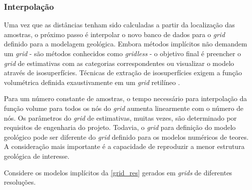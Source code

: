 \begin{figure}[H]
\end{figure}

\subsubsection{Interpolação}

Uma vez que as distâncias tenham sido calculadas a partir da localização das amostras, o próximo passo é interpolar o novo banco de dados para o \textit{grid} definido para a modelagem geológica. Embora métodos implícitos não demandem um \textit{grid} - são métodos conhecidos como \textit{gridless} - o objetivo final é preencher o \textit{grid} de estimativas com as categorias correspondentes ou visualizar o modelo através de isosuperfícies. Técnicas de extração de isosuperfícies exigem a função volumétrica definida exaustivamente em um \textit{grid} retilíneo  \cite{martin2017implicitmodeling}.

Para um número constante de amostras, o tempo necessário para interpolação da função volume para todos os nós do \textit{grid} aumenta linearmente com o número de nós. Os parâmetros do \textit{grid} de estimativas, muitas vezes, são determinado por requisitos de engenharia do projeto. Todavia, o \textit{grid} para definição do modelo geológico pode ser diferente do \textit{grid} definido para os modelos numéricos de teores. A consideração mais importante é a capacidade de reproduzir a menor estrutura geológica de interesse.

Considere os modelos implícitos da \autoref{grid_res} gerados em \textit{grids} de diferentes resoluções.

